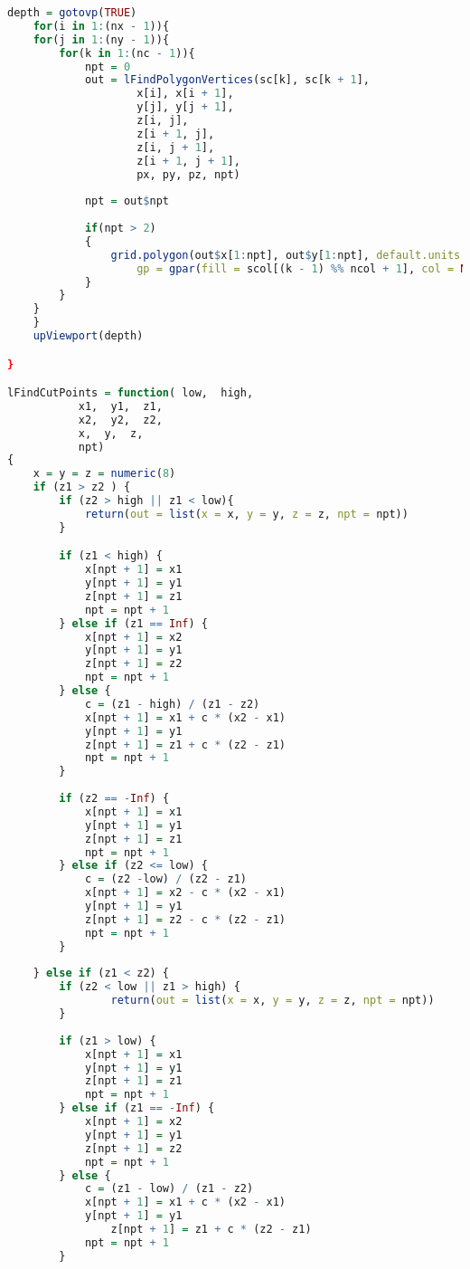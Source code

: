 \begin{lstlisting}[language = R]
    depth = gotovp(TRUE)
    for(i in 1:(nx - 1)){
    for(j in 1:(ny - 1)){
        for(k in 1:(nc - 1)){
            npt = 0
            out = lFindPolygonVertices(sc[k], sc[k + 1],
                    x[i], x[i + 1],
                    y[j], y[j + 1],
                    z[i, j],
                    z[i + 1, j],
                    z[i, j + 1],
                    z[i + 1, j + 1],
                    px, py, pz, npt)
            
            npt = out$npt
            
            if(npt > 2)
            { 
                grid.polygon(out$x[1:npt], out$y[1:npt], default.units = 'native',
                    gp = gpar(fill = scol[(k - 1) %% ncol + 1], col = NA), name = 'filled.contour')
            }
        }
    }
    }
    upViewport(depth)

}

lFindCutPoints = function( low,  high,
           x1,  y1,  z1,
           x2,  y2,  z2,
           x,  y,  z,
           npt)
{
    x = y = z = numeric(8)
    if (z1 > z2 ) {
        if (z2 > high || z1 < low){
            return(out = list(x = x, y = y, z = z, npt = npt))
        }

        if (z1 < high) {
            x[npt + 1] = x1
            y[npt + 1] = y1
            z[npt + 1] = z1
            npt = npt + 1
        } else if (z1 == Inf) {
            x[npt + 1] = x2
            y[npt + 1] = y1
            z[npt + 1] = z2
            npt = npt + 1
        } else {
            c = (z1 - high) / (z1 - z2)
            x[npt + 1] = x1 + c * (x2 - x1)
            y[npt + 1] = y1
            z[npt + 1] = z1 + c * (z2 - z1)
            npt = npt + 1
        }
        
        if (z2 == -Inf) {
            x[npt + 1] = x1
            y[npt + 1] = y1
            z[npt + 1] = z1
            npt = npt + 1
        } else if (z2 <= low) {
            c = (z2 -low) / (z2 - z1)
            x[npt + 1] = x2 - c * (x2 - x1)
            y[npt + 1] = y1
            z[npt + 1] = z2 - c * (z2 - z1)
            npt = npt + 1
        }
        
    } else if (z1 < z2) {
        if (z2 < low || z1 > high) {
                return(out = list(x = x, y = y, z = z, npt = npt))
        }
        
        if (z1 > low) {
            x[npt + 1] = x1
            y[npt + 1] = y1
            z[npt + 1] = z1
            npt = npt + 1
        } else if (z1 == -Inf) {
            x[npt + 1] = x2
            y[npt + 1] = y1
            z[npt + 1] = z2
            npt = npt + 1
        } else { 
            c = (z1 - low) / (z1 - z2)
            x[npt + 1] = x1 + c * (x2 - x1)
            y[npt + 1] = y1
                z[npt + 1] = z1 + c * (z2 - z1)
            npt = npt + 1
        }
        

\end{lstlisting}
